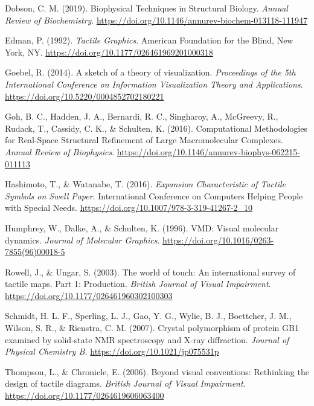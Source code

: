 \documentclass[11.5pt]{sig-alternate} %
\begin{document}
Dobson, C. M. (2019). Biophysical Techniques in Structural Biology. \textit{Annual Review of Biochemistry}. \url{https://doi.org/10.1146/annurev-biochem-013118-111947}

Edman, P. (1992). \textit{Tactile Graphics}. American Foundation for the Blind, New York, NY. \url{https://doi.org/10.1177/026461969201000318}

Goebel, R. (2014). A sketch of a theory of visualization. \textit{Proceedings of the 5th International Conference on Information Visualization Theory and Applications}. \url{https://doi.org/10.5220/0004852702180221}

Goh, B. C., Hadden, J. A., Bernardi, R. C., Singharoy, A., McGreevy, R., Rudack, T., Cassidy, C. K., \& Schulten, K. (2016). Computational Methodologies for Real-Space Structural Refinement of Large Macromolecular Complexes. \textit{Annual Review of Biophysics}. \url{https://doi.org/10.1146/annurev-biophys-062215-011113}

Hashimoto, T., \& Watanabe, T. (2016). \textit{Expansion Characteristic of Tactile Symbols on Swell Paper}. International Conference on Computers Helping People with Special Needs. \url{https://doi.org/10.1007/978-3-319-41267-2\_10}

Humphrey, W., Dalke, A., \& Schulten, K. (1996). VMD: Visual molecular dynamics. \textit{Journal of Molecular Graphics}. \url{https://doi.org/10.1016/0263-7855(96)00018-5}

Rowell, J., \& Ungar, S. (2003). The world of touch: An international survey of tactile maps. Part 1: Production. \textit{British Journal of Visual Impairment}. \url{https://doi.org/10.1177/026461960302100303}

Schmidt, H. L. F., Sperling, L. J., Gao, Y. G., Wylie, B. J., Boettcher, J. M., Wilson, S. R., \& Rienstra, C. M. (2007). Crystal polymorphism of protein GB1 examined by solid-state NMR spectroscopy and X-ray diffraction. \textit{Journal of Physical Chemistry B.} \url{https://doi.org/10.1021/jp075531p}

Thompson, L., \& Chronicle, E. (2006). Beyond visual conventions: Rethinking the design of tactile diagrams. \textit{British Journal of Visual Impairment}. \url{https://doi.org/10.1177/0264619606063400}
\end{document}
